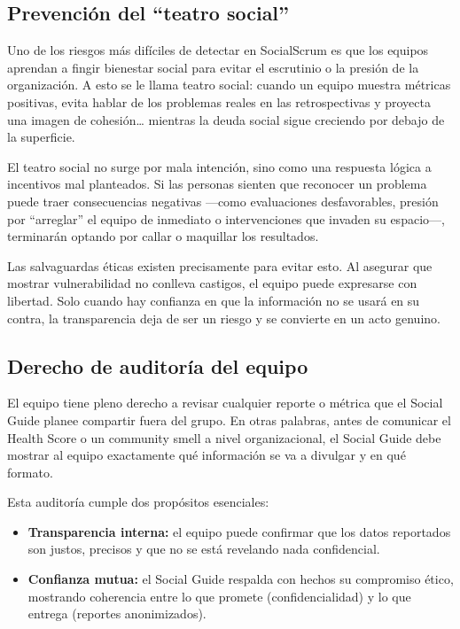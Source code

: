 \subsection{Prevención del ``teatro social''}

Uno de los riesgos más difíciles de detectar en SocialScrum es que los equipos aprendan a fingir bienestar social para evitar el escrutinio o la presión de la organización. A esto se le llama teatro social: cuando un equipo muestra métricas positivas, evita hablar de los problemas reales en las retrospectivas y proyecta una imagen de cohesión… mientras la deuda social sigue creciendo por debajo de la superficie.

El teatro social no surge por mala intención, sino como una respuesta lógica a incentivos mal planteados. Si las personas sienten que reconocer un problema puede traer consecuencias negativas —como evaluaciones desfavorables, presión por ``arreglar'' el equipo de inmediato o intervenciones que invaden su espacio—, terminarán optando por callar o maquillar los resultados.

Las salvaguardas éticas existen precisamente para evitar esto. Al asegurar que mostrar vulnerabilidad no conlleva castigos, el equipo puede expresarse con libertad. Solo cuando hay confianza en que la información no se usará en su contra, la transparencia deja de ser un riesgo y se convierte en un acto genuino.

\subsection{Derecho de auditoría del equipo}

El equipo tiene pleno derecho a revisar cualquier reporte o métrica que el Social Guide planee compartir fuera del grupo. En otras palabras, antes de comunicar el Health Score o un community smell a nivel organizacional, el Social Guide debe mostrar al equipo exactamente qué información se va a divulgar y en qué formato.

Esta auditoría cumple dos propósitos esenciales:

\begin{itemize}
    \item \textbf{Transparencia interna:} el equipo puede confirmar que los datos reportados son justos, precisos y que no se está revelando nada confidencial.
    \item \textbf{Confianza mutua:} el Social Guide respalda con hechos su compromiso ético, mostrando coherencia entre lo que promete (confidencialidad) y lo que entrega (reportes anonimizados).
\end{itemize}


